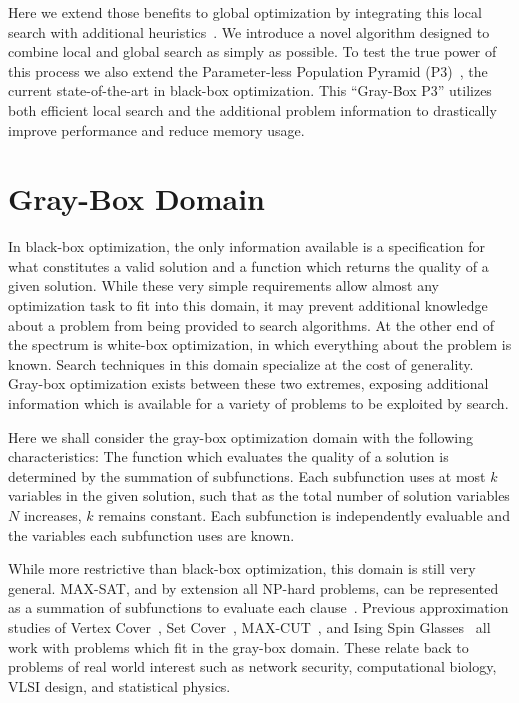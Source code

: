 \documentclass{sig-alternate}
\begin{document}
Here we extend those benefits to global optimization by integrating
this local search with additional heuristics~\cite{chen:2011:memetic}.
We introduce a novel algorithm designed to combine local
and global search as simply as possible. To test the true power of this
process we also extend the Parameter-less Population Pyramid (P3)~\cite{goldman:2014:p3}, the
current state-of-the-art in black-box optimization. This ``Gray-Box P3''
utilizes both efficient local search and the additional problem information
to drastically improve performance and reduce memory usage.

\section{Gray-Box Domain}
\label{sec-gray-box}
In black-box optimization, the only information available is a specification
for what constitutes a valid solution and a function which returns the quality
of a given solution. While these very simple requirements allow almost any
optimization task to fit into this domain, it may prevent additional knowledge
about a problem from being provided to search algorithms. At the other end of
the spectrum is white-box optimization, in which everything about the problem
is known. Search techniques in this domain specialize at the cost of generality.
Gray-box optimization exists between these two extremes, exposing additional
information which is available for a variety of problems to be exploited by search.

Here we shall consider the gray-box optimization domain with the following
characteristics: The function which evaluates the quality of a solution is determined by the summation
of subfunctions. Each subfunction uses at most $k$ variables in the given solution,
such that as the total number of solution variables $N$ increases, $k$ remains constant.
Each subfunction is independently evaluable and the variables each subfunction uses are known.

While more restrictive than black-box optimization, this domain is still very general.
MAX-SAT, and by extension all NP-hard problems, can be represented
as a summation of subfunctions to evaluate each clause~\cite{whitley:2013:greedy}.
Previous approximation studies of Vertex Cover~\cite{oliveto:2009:vertexcover},
Set Cover~\cite{yu:2010:setcover}, MAX-CUT~\cite{festa:2002:maxcut}, and
Ising Spin Glasses~\cite{pelikan:2003:hboaising} all work with problems which fit
in the gray-box domain. These relate back to problems of real world interest such
as network security, computational biology, VLSI design, and statistical physics.
\end{document}
